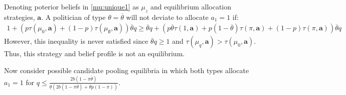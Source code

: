 \documentclass[11pt,english]{article}
\begin{document}
\begin{itemize}
Denoting poterior beliefs in \eqref{mu:unique1} as $\mu_z$ and equilibrium allocation strategies, $\boldsymbol{a}$. A politician of type $\theta = \overline{\theta}$ will not deviate to allocate $a_1 = 1$ if:
\begin{align*}
1 + (p\tau(\mu_0, \boldsymbol{a}) + (1-p)\tau(\mu_\emptyset, \boldsymbol{a})) \overline{\theta}q \geq \overline{\theta}q + (p\overline{\theta}\tau(1, \boldsymbol{a}) + p(1-\overline{\theta})\tau(\pi, \boldsymbol{a}) + (1-p)\tau(\pi, \boldsymbol{a}))\overline{\theta}q
\end{align*}
However, this inequality is never satisfied since $\overline{\theta}q \geq 1$ and $\tau(\mu_q, \boldsymbol{a}) > \tau(\mu_0, \boldsymbol{a})$. Thus, this strategy and belief profile is not an equilibrium.
\end{itemize}
Now consider possible candidate pooling equilibria in which both types allocate $a_1 = 1$ for $q \leq \frac{2b (1 - \pi \overline{\theta})}{\underline{\theta}(2b(1-\pi \overline{\theta})+\overline{\theta}p(1-\pi))}$. 
\end{document}
